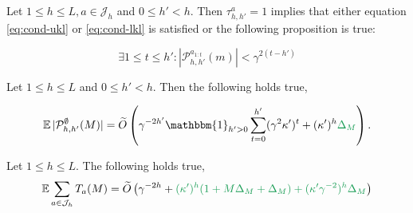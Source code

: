 \documentclass[runningheads]{llncs}
\newcommand{\diff}[1]{\textcolor{ForestGreen}{#1}}
\begin{document}
\begin{lemma}
\label{lemma:size_Ph}
Let $1 \leq h \leq L,  a\in \mathcal{J}_h$ and $0\leq h'<h$. Then $\tau^a_{h,h'}=1$ implies that either equation \eqref{eq:cond-ukl} or \eqref{eq:cond-lkl} is satisfied or the following proposition is true:


\begin{equation}
    \label{eq:P-min-size}
    \exists 1\leq t \leq h': |\mathcal{P}_{h,h'}^{a_{1:t}}(m)| < \gamma^{2(t-h')}
\end{equation}
\end{lemma}

\begin{lemma}
\label{lemma:expected-P-size}
Let $1\leq h\leq L$ and $0 \leq h' < h$. Then the following holds true,

\begin{equation*}
    \expectedvalue |\mathcal{P}^\emptyset_{h,h'}(M)| = \tilde{O}\left(\gamma^{-2h'}\mathbbm{1}_{h'>0}\sum_{t=0}^{h'}(\gamma^2 \kappa')^t + (\kappa')^h\diff{\Delta_M} \right).
\end{equation*}
\end{lemma}

\begin{lemma}
\label{lemma:expected-plays-count}
Let $1\leq h\leq L$. The following holds true,
\begin{equation*}
    \expectedvalue \sum_{a\in \mathcal{J}_h} T_a(M) = \tilde{O}\left(\gamma^{-2h} + \diff{(\kappa')^h(1+M\Delta_M+\Delta_M) + (\kappa'\gamma^{-2})^h\Delta_M}\right)
\end{equation*}
\end{lemma}
\end{document}
